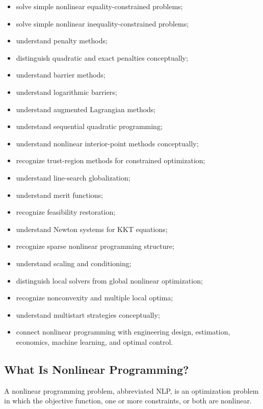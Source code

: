 {\begin{itemize}
    \item solve simple nonlinear equality-constrained problems;
    \item solve simple nonlinear inequality-constrained problems;
    \item understand penalty methods;
    \item distinguish quadratic and exact penalties conceptually;
    \item understand barrier methods;
    \item understand logarithmic barriers;
    \item understand augmented Lagrangian methods;
    \item understand sequential quadratic programming;
    \item understand nonlinear interior-point methods conceptually;
    \item recognize trust-region methods for constrained optimization;
    \item understand line-search globalization;
    \item understand merit functions;
    \item recognize feasibility restoration;
    \item understand Newton systems for KKT equations;
    \item recognize sparse nonlinear programming structure;
    \item understand scaling and conditioning;
    \item distinguish local solvers from global nonlinear optimization;
    \item recognize nonconvexity and multiple local optima;
    \item understand multistart strategies conceptually;
    \item connect nonlinear programming with engineering design,
          estimation, economics, machine learning, and optimal control.
\end{itemize}
}

\subsection{What Is Nonlinear Programming?}
\label{subsec:what-is-nonlinear-programming}

A nonlinear programming problem, abbreviated NLP, is an optimization
problem in which the objective function, one or more constraints, or both
are nonlinear.

